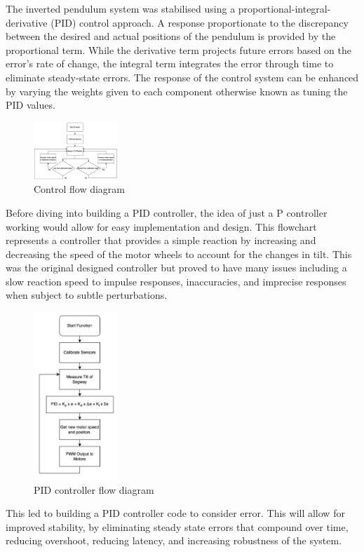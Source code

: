 \vspace{2mm}

The inverted pendulum system was stabilised using a proportional-integral-derivative (PID) control approach. A response proportionate to the discrepancy between the desired and actual positions of the pendulum is provided by the proportional term. While the derivative term projects future errors based on the error's rate of change, the integral term integrates the error through time to eliminate steady-state errors. The response of the control system can be enhanced by varying the weights given to each component otherwise known as tuning the PID values.


\begin{figure}
    \centerline{\includegraphics[width=0.28\textwidth]{images/control-flow.png}}
    \caption{Control flow diagram}
\end{figure}
Before diving into building a PID controller, the idea of just a P controller working would allow for easy implementation and design. This flowchart represents a controller that provides a simple reaction by increasing and decreasing the speed of the motor wheels to account for the changes in tilt. This was the original designed controller but proved to have many issues including a slow reaction speed to impulse responses, inaccuracies, and imprecise responses when subject to subtle perturbations.  

\begin{figure}
    \centerline{\includegraphics[width=0.28\textwidth]{images/pid-flow.png}}
    \caption{PID controller flow diagram}
\end{figure}
This led to building a PID controller code to consider error. This will allow for improved stability, by eliminating steady state errors that compound over time, reducing overshoot, reducing latency, and increasing robustness of the system.

